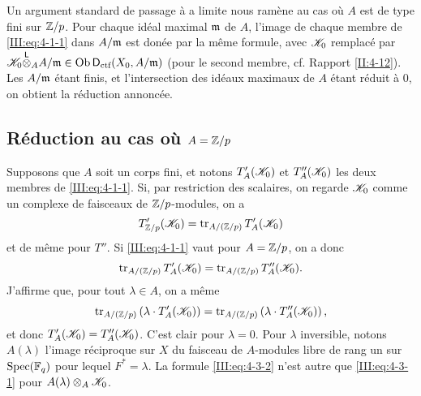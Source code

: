 Un argument standard de passage à a limite nous ramène au cas où $A$ est 
de type fini sur $\mathbb{Z}/p$. Pour chaque idéal maximal $\mathfrak{m}$ de $A$, l'image de 
chaque membre de \eqref{III:eq:4-1-1} dans $A/\mathfrak{m}$ est donée par la même 
formule, avec $\mathscr{K}_0$ remplacé par 
$\mathscr{K}_0{\overset{\mathsf{L}}{\otimes}}_A A/\mathfrak{m}\in\operatorname{Ob}\mathsf{D}_\text{ctf}(X_0,A/\mathfrak{m})$ (pour le second membre, 
cf. Rapport \ref{II:4-12}). Les $A/\mathfrak{m}$ étant finis, et l'intersection des 
idéaux maximaux de $A$ étant réduit à $0$, on obtient la réduction 
annoncée.





\subsection{Réduction au cas où \texorpdfstring{$A=\mathbb{Z}/p$}{A=Z/p}}\label{III:4-3}

Supposons que $A$ soit un corps fini, et notons $T_A'(\mathscr{K}_0)$ et $T_A''(\mathscr{K}_0)$ 
les deux membres de \eqref{III:eq:4-1-1}. Si, par restriction des scalaires, on 
regarde $\mathscr{K}_0$ comme un complexe de faisceaux de $\mathbb{Z}/p$-modules, on a 
\[
  T_{\mathbb{Z}/p}'(\mathscr{K}_0) = \operatorname{tr}_{A/(\mathbb{Z}/p)} T_A'(\mathscr{K}_0)
\]
et de même pour $T''$. Si \eqref{III:eq:4-1-1} vaut pour $A=\mathbb{Z}/p$, on a donc 
\begin{equation}\label{III:eq:4-3-1}
  \operatorname{tr}_{A/(\mathbb{Z}/p)} T_A'(\mathscr{K}_0) = \operatorname{tr}_{A/(\mathbb{Z}/p)} T_A''(\mathscr{K}_0) \text{.}
\end{equation}
J'affirme que, pour tout $\lambda\in A$, on a même 
\begin{equation}\label{III:eq:4-3-2}
  \operatorname{tr}_{A/(\mathbb{Z}/p)}\left(\lambda\cdot T_A'(\mathscr{K}_0)\right) = \operatorname{tr}_{A/(\mathbb{Z}/p)}\left(\lambda\cdot T_A''(\mathscr{K}_0)\right) \text{,}
\end{equation}
et donc $T_A'(\mathscr{K}_0) = T_A''(\mathscr{K}_0)$. C'est clair pour $\lambda=0$. Pour 
$\lambda$ inversible, notons $A(\lambda)$ l'image réciproque sur $X$ du 
faisceau de $A$-modules libre de rang un sur $\operatorname{Spec}(\mathbb{F}_q)$ pour lequel 
$F^*=\lambda$. La formule \eqref{III:eq:4-3-2} n'est autre que 
\eqref{III:eq:4-3-1} pour $A(\lambda)\otimes_A \mathscr{K}_0$. 





